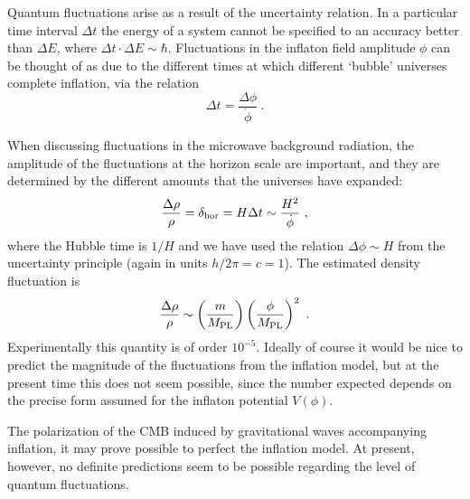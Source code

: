 \documentclass[12pt,a4paper]{article}
\begin{document}
Quantum fluctuations arise as a result of the uncertainty relation. In a particular time interval $\Delta t$ the energy of a system cannot be specified to an accuracy better than $\Delta E$, where $\Delta t \cdot \Delta E \sim \hbar$. Fluctuations in the inflaton field amplitude $\phi$ can be thought of as due to the different times at which different `bubble' universes complete inflation, via the relation
\begin{equation}
\Delta t = \dfrac{\Delta \phi}{\dot{\phi}} ~.
\end{equation}

When discussing fluctuations in the microwave background radiation, the amplitude of the fluctuations at the horizon scale are important, and they are determined by the different amounts that the universes have expanded:
\begin{equation}
\dfrac{\Delta \rho}{\rho} = \delta_{\rm hor} = H \Delta t \sim \dfrac{H^2}{\dot{\phi}} ~,
\end{equation}
where the Hubble time is $1/H$ and we have used the relation $\Delta \phi \sim H$ from the uncertainty principle (again in units $h/2\pi = c = 1$). The estimated density fluctuation is
\begin{equation}
\dfrac{\Delta \rho}{\rho} \sim \left(\dfrac{m}{M_{\rm PL} } \right)  \left(\dfrac{\phi}{M_{\rm PL} } \right)^2 ~.
\end{equation}
Experimentally this quantity is of order $10^{-5}$. Ideally of course it would be nice to predict the magnitude of the fluctuations from the inflation model, but at the present time this does not seem possible, since the number expected depends on the precise form assumed for the inflaton potential $V(\phi)$.

The polarization of the CMB induced by gravitational waves accompanying inflation, it may prove possible to perfect the inflation model. At present, however, no definite predictions seem to be possible regarding the level of quantum
fluctuations. 
\end{document}
